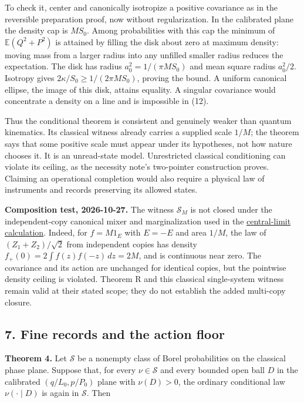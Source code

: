 \documentclass[11pt,a4paper]{article}
\begin{document}
To check it, center and canonically isotropize a positive covariance as
in the reversible preparation proof, now without regularization. In the
calibrated plane the density cap is \(M S_0\). Among probabilities with
this cap the minimum of \(\mathbb E(Q^2+P^2)\) is attained by filling
the disk about zero at maximum density: moving mass from a larger radius
into any unfilled smaller radius reduces the expectation. The disk has
radius \(a_0^2=1/(\pi M S_0)\) and mean square radius \(a_0^2/2\).
Isotropy gives \(2\kappa/S_0\ge1/(2\pi M S_0)\), proving the bound. A
uniform canonical ellipse, the image of this disk, attains equality. A
singular covariance would concentrate a density on a line and is
impossible in (12).

Thus the conditional theorem is consistent and genuinely weaker than
quantum kinematics. Its classical witness already carries a supplied
scale \(1/M\); the theorem says that some positive scale must appear
under its hypotheses, not how nature chooses it. It is an unread-state
model. Unrestricted classical conditioning can violate its ceiling, as
the necessity note's two-pointer construction proves. Claiming an
operational completion would also require a physical law of instruments
and records preserving its allowed states.

\textbf{Composition test, 2026-10-27.} The witness \(\mathcal S_M\) is
not closed under the independent-copy canonical mixer and
marginalization used in the
\href{central-limit-canonical-gaussian-sector.md}{central-limit
calculation}. Indeed, for \(f=M1_E\) with \(E=-E\) and area \(1/M\), the
law of \((Z_1+Z_2)/\sqrt2\) from independent copies has density
\(f_+(0)=2\int f(z)f(-z)\,dz=2M\), and is continuous near zero. The
covariance and its action are unchanged for identical copies, but the
pointwise density ceiling is violated. Theorem R and this classical
single-system witness remain valid at their stated scope; they do not
establish the added multi-copy closure.

\hypertarget{fine-records-and-the-action-floor}{%
\subsection{7. Fine records and the action
floor}\label{fine-records-and-the-action-floor}}

\textbf{Theorem 4.} Let \(\mathcal S\) be a nonempty class of Borel
probabilities on the classical phase plane. Suppose that, for every
\(\nu\in\mathcal S\) and every bounded open ball \(D\) in the calibrated
\((q/L_0,p/P_0)\) plane with \(\nu(D)>0\), the ordinary conditional law
\(\nu(\cdot\mid D)\) is again in \(\mathcal S\). Then
\end{document}
